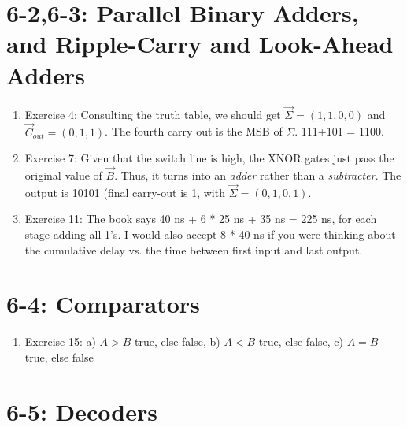 \documentclass[10pt]{article}
\begin{document}
\maketitle

\section{6-2,6-3: Parallel Binary Adders, and Ripple-Carry and Look-Ahead Adders}

\begin{enumerate}
\item Exercise 4: Consulting the truth table, we should get $\vec{\Sigma} = (1,1,0,0)$ and $\vec{C}_{out} = (0,1,1)$.  The fourth carry out is the MSB of $\Sigma$.  111+101 = 1100.
\item Exercise 7: Given that the switch line is high, the XNOR gates just pass the original value of $\vec{B}$.  Thus, it turns into an \textit{adder} rather than a \textit{subtracter}.  The output is 10101 (final carry-out is 1, with $\vec{\Sigma} = (0,1,0,1)$.
\item Exercise 11: The book says 40 ns + 6 * 25 ns + 35 ns = 225 ns, for each stage adding all 1's.  I would also accept 8 * 40 ns if you were thinking about the cumulative delay vs. the time between first input and last output.
\end{enumerate}

\section{6-4: Comparators}

\begin{enumerate}
\item Exercise 15: a) $A>B$ true, else false, b) $A<B$ true, else false, c) $A=B$ true, else false
\end{enumerate}

\section{6-5: Decoders}
\end{document}
